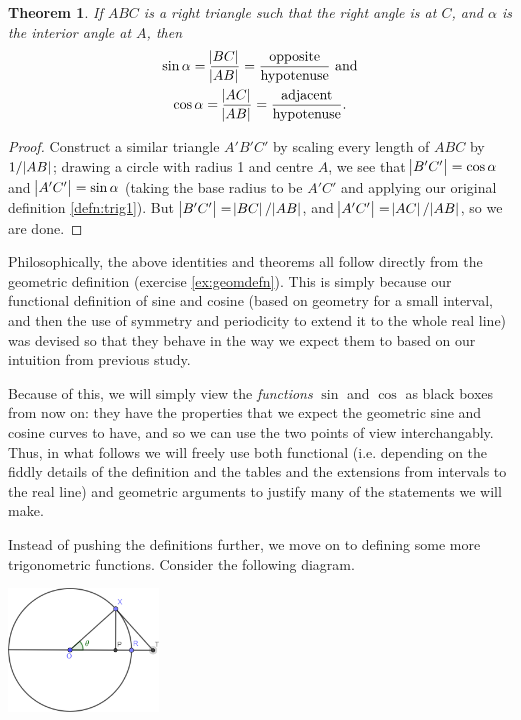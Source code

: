 \documentclass[a4paper,leqno]{article}
\numberwithin{equation}{section}
\newtheorem{thm}[equation]{Theorem}
\theoremstyle{definition}
\theoremstyle{remark}
\begin{document}
\begin{thm}\label{thm:ratios}
  If $ ABC $ is a right triangle such that the right angle is at $ C $, and $ \alpha $ is the interior angle at $ A $, then
    \begin{gather}
      \sin \alpha = \frac{\abs{BC}}{\abs{AB}} = \frac{\text{opposite}}{\text{hypotenuse}} \text{ and}\\
      \cos \alpha = \frac{\abs{AC}}{\abs{AB}} = \frac{\text{adjacent}}{\text{hypotenuse}}.
    \end{gather}
\end{thm}
\begin{proof}
  Construct a similar triangle $ A'B'C' $ by scaling every length of $ ABC $ by $ 1/\abs{AB} $; drawing a circle
  with radius 1 and centre $ A $, we see that $ \abs{B'C'} = \cos \alpha $ and $ \abs{A'C'} = \sin \alpha $ (taking
  the base radius to be $ A'C' $ and applying our original definition \ref{defn:trig1}). But $ \abs{B'C'} = \abs{BC}/\abs{AB} $,
  and $ \abs{A'C'} = \abs{AC}/\abs{AB} $, so we are done.
\end{proof}

Philosophically, the above identities and theorems all follow directly from the geometric definition (exercise \ref{ex:geomdefn}). This
is simply because our functional definition of sine and cosine (based on geometry for a small interval, and then the use of symmetry and periodicity to
extend it to the whole real line) was devised so that they behave in the way we expect them to based on our intuition from previous study.

Because of this, we will simply view the \emph{functions} $ \sin $ and $ \cos $ as black boxes from now on: they have the properties that we expect
the geometric sine and cosine curves to have, and so we can use the two points of view interchangably. Thus, in what follows we will freely
use both functional (i.e. depending on the fiddly details of the definition and the tables and the extensions from intervals to the real line)
and geometric arguments to justify many of the statements we will make.

Instead of pushing the definitions further, we move on to defining some more trigonometric functions. Consider the following diagram.

\begin{center}
  \includegraphics[width=0.3\textwidth]{tangent}
\end{center}
\end{document}
